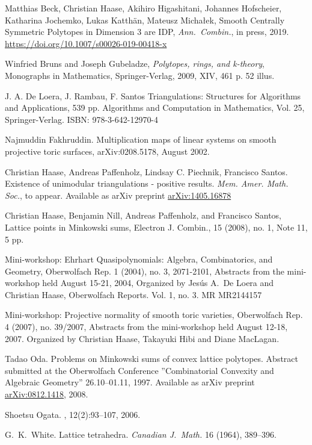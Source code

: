 \documentclass{amsart}
\theoremstyle{plain}
\theoremstyle{definition}
\begin{document}
\begin{thebibliography}{99}

Matthias Beck, Christian Haase, Akihiro Higashitani, Johannes Hofscheier, Katharina Jochemko, Lukas Katth\"an, Mateusz Micha{\l}ek,
Smooth Centrally Symmetric Polytopes in Dimension 3 are IDP,
\emph{Ann.~Combin.}, in press, 2019.
\url{https://doi.org/10.1007/s00026-019-00418-x}

Winfried Bruns and Joseph Gubeladze, \emph{Polytopes, rings, and k-theory}, Monographs in Mathematics,
  Springer-Verlag, 2009, XIV, 461 p. 52 illus.
  
J. A. De Loera, J. Rambau, F. Santos
Triangulations: Structures for Algorithms and Applications, 539 pp.
Algorithms and Computation in Mathematics, Vol. 25, Springer-Verlag. 
ISBN: 978-3-642-12970-4

Najmuddin Fakhruddin.
\newblock Multiplication maps of linear systems on smooth projective toric
  surfaces, arXiv:0208.5178, August 2002.
  
Christian Haase, Andreas Paffenholz, Lindsay C. Piechnik, Francisco Santos. Existence of unimodular triangulations - positive results. 
 \emph{Mem. Amer. Math. Soc.}, to appear.
 Available as arXiv preprint \href{https://arxiv.org/abs/1405.1687}{arXiv:1405.16878}
 
Christian Haase, Benjamin Nill, Andreas Paffenholz, and Francisco Santos, Lattice points in Minkowski sums, 
Electron J. Combin., 15 (2008), no. 1, Note 11, 5 pp.

Mini-workshop: Ehrhart Quasipolynomials: Algebra, Combinatorics, and Geometry, Oberwolfach Rep. 1 (2004), no. 3, 2071-2101, Abstracts from the mini-workshop held August 15-21, 2004, Organized by Jes\'us A.~De Loera and Christian Haase, Oberwolfach Reports. Vol. 1, no. 3. MR MR2144157

Mini-workshop: Projective normality of smooth toric varieties, Oberwolfach Rep. 4 (2007), no. 39/2007, Abstracts from the mini-workshop held August 12-18, 2007. Organized by Christian Haase, Takayuki Hibi and Diane MacLagan.

Tadao Oda. Problems on Minkowski sums of convex lattice polytopes. 
Abstract submitted at the Oberwolfach Conference ''Combinatorial Convexity and Algebraic Geometry'' 26.10--01.11, 1997.
Available as arXiv preprint \href{https://arxiv.org/abs/0812.1418}{arXiv:0812.1418}, 2008.

Shoetsu Ogata.
, 12(2):93--107, 2006.

G.~K.~White.
Lattice tetrahedra.
\emph{Canadian J.~Math.} 16 (1964), 389--396.

\end{thebibliography}
\end{document}
